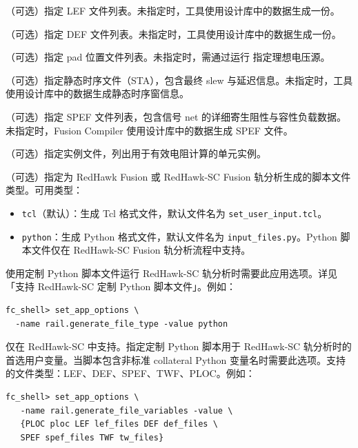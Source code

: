 \begin{description}[style=nextline,leftmargin=1.2em,font=\ttfamily]
\item[\appopt{rail.lef\_files}]
（可选）指定 LEF 文件列表。未指定时，工具使用设计库中的数据生成一份。

\item[\appopt{rail.def\_files}]
（可选）指定 DEF 文件列表。未指定时，工具使用设计库中的数据生成一份。

\item[\appopt{rail.pad\_files}]
（可选）指定 pad 位置文件列表。未指定时，需通过运行  指定理想电压源。

\item[\appopt{rail.sta\_file}]
（可选）指定静态时序文件（STA），包含最终 slew 与延迟信息。未指定时，工具使用设计库中的数据生成静态时序窗信息。

\item[\appopt{rail.spef\_files}]
（可选）指定 SPEF 文件列表，包含信号 net 的详细寄生阻性与容性负载数据。未指定时，Fusion Compiler 使用设计库中的数据生成 SPEF 文件。

\item[\appopt{rail.effective\_resistance\_instance\_file}]
（可选）指定实例文件，列出用于有效电阻计算的单元实例。

\item[\appopt{rail.generate\_file\_type}]
（可选）指定为 RedHawk Fusion 或 RedHawk-SC Fusion 轨分析生成的脚本文件类型。可用类型：
\begin{itemize}
  \item \texttt{tcl}（默认）：生成 Tcl 格式文件，默认文件名为 \texttt{set\_user\_input.tcl}。
  \item \texttt{python}：生成 Python 格式文件，默认文件名为 \texttt{input\_files.py}。Python 脚本文件仅在 RedHawk-SC Fusion 轨分析流程中支持。
\end{itemize}
使用定制 Python 脚本文件运行 RedHawk-SC 轨分析时需要此应用选项。详见「支持 RedHawk-SC 定制 Python 脚本文件」。例如：
\begin{lstlisting}
fc_shell> set_app_options \
  -name rail.generate_file_type -value python
\end{lstlisting}

\item[\appopt{rail.generate\_file\_variables}]
仅在 RedHawk-SC 中支持。指定定制 Python 脚本用于 RedHawk-SC 轨分析时的首选用户变量。当脚本包含非标准 collateral Python 变量名时需要此选项。支持的文件类型：LEF、DEF、SPEF、TWF、PLOC。例如：
\begin{lstlisting}
fc_shell> set_app_options \
   -name rail.generate_file_variables -value \
   {PLOC ploc LEF lef_files DEF def_files \
   SPEF spef_files TWF tw_files}
\end{lstlisting}


\end{description}
